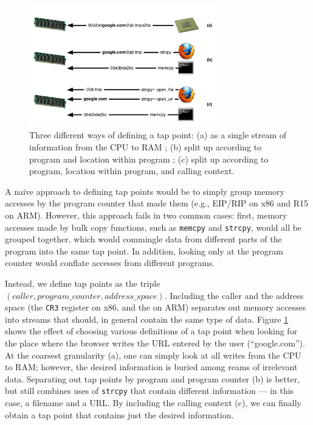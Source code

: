 \begin{figure}[t]
\begin{center}
\includegraphics[width=3.2in]{tappoint.pdf}
\end{center}
\caption{Three different ways of defining a tap point: (a) as a single
stream of information from the CPU to RAM ; (b) split up according to
program and location within program ; (c) split up according to program,
location within program, and calling context.}
\label{fig:tappoint}
\end{figure}

A naive approach to defining tap points would be to simply group memory
accesses by the program counter that made them (e.g., EIP/RIP on x86 and
R15 on ARM). However, this approach fails in two common cases: first,
memory accesses made by bulk copy functions, such as \texttt{memcpy} and
\texttt{strcpy}, would all be grouped together, which would commingle
data from different parts of the program into the same tap point. In
addition, looking only at the program counter would conflate accesses
from different programs.

Instead, we define tap points as the triple $(caller, program\_counter,
address\_space)$. Including the caller and the address space (the
\texttt{CR3} register on x86, and the  on ARM) separates
out memory accesses into streams that should, in general contain the
same type of data. Figure \ref{fig:tappoint} shows the effect of
choosing various definitions of a tap point when looking for the place
where the browser writes the URL entered by the user (``google.com'').
At the coarsest granularity (a), one can simply look at all writes from
the CPU to RAM; however, the desired information is buried among reams
of irrelevant data. Separating out tap points by program and program
counter (b) is better, but still combines uses of \texttt{strcpy} that
contain different information --- in this case, a filename and a URL. By
including the calling context (c), we can finally obtain a tap point
that contains just the desired information.

